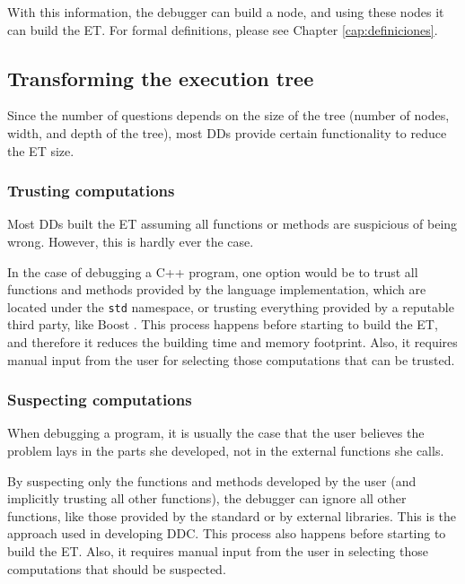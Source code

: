 With this information, the debugger can build a node, and using these nodes it can build the ET.
%
For formal definitions, please see Chapter \ref{cap:definiciones}.

\subsection{Transforming the execution tree}

Since the number of questions depends on the size of the tree (number of nodes, width, and depth of the tree), most DDs provide certain functionality to reduce the ET size.

\subsubsection{Trusting computations}

Most DDs built the ET assuming all functions or methods are suspicious  of being wrong.
However, this is hardly ever the case.

In the case of debugging a C++ program, one option would be to trust all functions and methods provided by the language implementation, which are located under the \verb|std| namespace, or trusting everything provided by a reputable third party, like Boost \cite{TheBoostLibraries}.
This process happens before starting to build the ET, and therefore it reduces the building time and memory footprint. Also, it requires manual input from the user for selecting those computations that can be trusted.

\subsubsection{Suspecting computations}

When debugging a program, it is usually the case that the user believes the problem lays in the parts she developed, not in the external functions she calls.

By suspecting only the functions and methods developed by the user (and implicitly trusting all other functions), the debugger can ignore all other functions, like those provided by the standard or by external libraries.
This is the approach used in developing DDC.
This process also happens before starting to build the ET. Also, it requires manual input from the user in selecting those computations that should be suspected.

